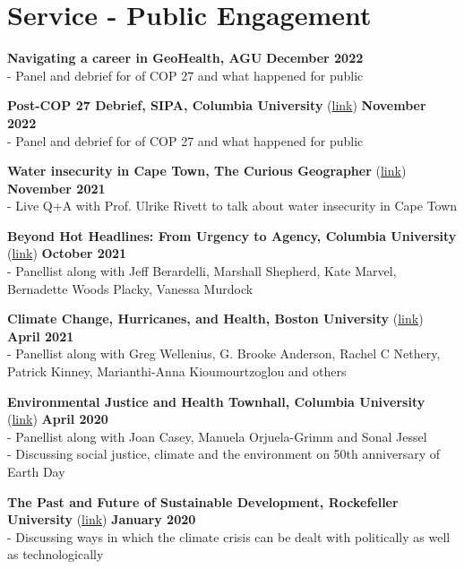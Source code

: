 \section*{Service - Public Engagement}

\noindent \textbf{Navigating a career in GeoHealth, AGU} \hfill \textbf{December 2022}\\
\noindent - Panel and debrief for of COP 27 and what happened for public 
\medskip

\noindent \textbf{Post-COP 27 Debrief, SIPA, Columbia University} (\href{https://events.columbia.edu/cal/event/showEventMore.rdo}{link}) \hfill \textbf{November 2022}\\
\noindent - Panel and debrief for of COP 27 and what happened for public 
\medskip

\noindent \textbf{Water insecurity in Cape Town, The Curious Geographer} (\href{https://www.youtube.com/watch?v=5T58BXv41sE}{link}) \hfill \textbf{November 2021}\\
\noindent - Live Q+A with Prof. Ulrike Rivett to talk about water insecurity in Cape Town \medskip

\noindent \textbf{Beyond Hot Headlines: From Urgency to Agency, Columbia University} (\href{https://www.youtube.com/watch?v=4PMs3LOD13k}{link}) \hfill \textbf{October 2021}\\
\noindent - Panellist along with Jeff Berardelli, Marshall Shepherd, Kate Marvel, Bernadette Woods Placky, Vanessa Murdock \medskip

\noindent \textbf{Climate Change, Hurricanes, and Health, Boston University} (\href{https://bit.ly/2TfExZb}{link}) \hfill \textbf{April 2021}\\
\noindent - Panellist along with Greg Wellenius, G. Brooke Anderson, Rachel C Nethery, Patrick Kinney, Marianthi-Anna Kioumourtzoglou and others \medskip

\noindent \textbf{Environmental Justice and Health Townhall, Columbia University} (\href{https://bit.ly/3bsdZZ3}{link}) \hfill \textbf{April 2020}\\
\noindent - Panellist along with Joan Casey, Manuela Orjuela-Grimm and Sonal Jessel\\
\noindent - Discussing social justice, climate and the environment on 50th anniversary of Earth Day \medskip

\noindent \textbf{The Past and Future of Sustainable Development, Rockefeller University} (\href{https://bit.ly/2UoPrdD}{link}) \hfill \textbf{January 2020}\\
\noindent - Discussing ways in which the climate crisis can be dealt with politically as well as technologically \medskip

